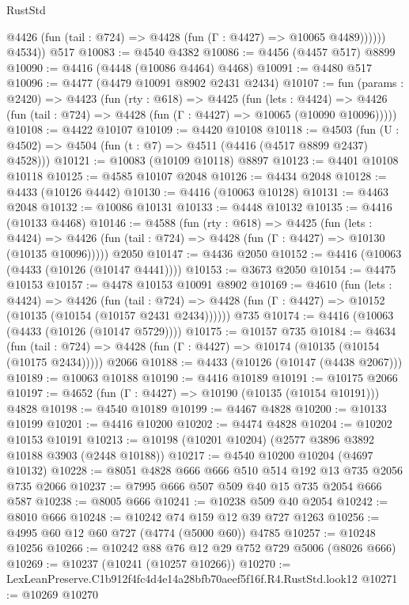\begin{lexlean}{RustStd}
\begin{coremodule}
              @4426 (fun (tail : @724) => @4428 (fun (Γ : @4427) => @10065 @4489))))))
        @4534))
    @517
@10083 := @4540 @4382
@10086 := @4456 (@4457 @517) @8899
@10090 := @4416 (@4448 (@10086 @4464) @4468)
@10091 := @4480 @517
@10096 := @4477 (@4479 @10091 @8902 @2431 @2434)
@10107 := fun (params : @2420) =>
  @4423
    (fun (rty : @618) =>
    @4425
      (fun (lets : @4424) =>
      @4426 (fun (tail : @724) => @4428 (fun (Γ : @4427) => @10065 (@10090 @10096)))))
@10108 := @4422 @10107
@10109 := @4420 @10108
@10118 := @4503 (fun (U : @4502) => @4504 (fun (t : @7) => @4511 (@4416 (@4517 @8899 @2437) @4528)))
@10121 := @10083 (@10109 @10118) @8897
@10123 := @4401 @10108 @10118
@10125 := @4585 @10107 @2048
@10126 := @4434 @2048
@10128 := @4433 (@10126 @4442)
@10130 := @4416 (@10063 @10128)
@10131 := @4463 @2048
@10132 := @10086 @10131
@10133 := @4448 @10132
@10135 := @4416 (@10133 @4468)
@10146 := @4588
    (fun (rty : @618) =>
    @4425
      (fun (lets : @4424) =>
      @4426 (fun (tail : @724) => @4428 (fun (Γ : @4427) => @10130 (@10135 @10096)))))
    @2050
@10147 := @4436 @2050
@10152 := @4416 (@10063 (@4433 (@10126 (@10147 @4441))))
@10153 := @3673 @2050
@10154 := @4475 @10153
@10157 := @4478 @10153 @10091 @8902
@10169 := @4610
    (fun (lets : @4424) =>
    @4426
      (fun (tail : @724) =>
      @4428 (fun (Γ : @4427) => @10152 (@10135 (@10154 (@10157 @2431 @2434))))))
    @735
@10174 := @4416 (@10063 (@4433 (@10126 (@10147 @5729))))
@10175 := @10157 @735
@10184 := @4634
    (fun (tail : @724) => @4428 (fun (Γ : @4427) => @10174 (@10135 (@10154 (@10175 @2434)))))
    @2066
@10188 := @4433 (@10126 (@10147 (@4438 @2067)))
@10189 := @10063 @10188
@10190 := @4416 @10189
@10191 := @10175 @2066
@10197 := @4652 (fun (Γ : @4427) => @10190 (@10135 (@10154 @10191))) @4828
@10198 := @4540 @10189
@10199 := @4467 @4828
@10200 := @10133 @10199
@10201 := @4416 @10200
@10202 := @4474 @4828
@10204 := @10202 @10153 @10191
@10213 := @10198 (@10201 @10204) (@2577 @3896 @3892 @10188 @3903 (@2448 @10188))
@10217 := @4540 @10200 @10204 (@4697 @10132)
@10228 := @8051 @4828 @666 @666 @510 @514 @192 @13 @735 @2056 @735 @2066
@10237 := @7995 @666 @507 @509 @40 @15 @735 @2054 @666 @587
@10238 := @8005 @666
@10241 := @10238 @509 @40 @2054
@10242 := @8010 @666
@10248 := @10242 @74 @159 @12 @39 @727 @1263
@10256 := @4995 @60 @12 @60 @727 (@4774 (@5000 @60)) @4785
@10257 := @10248 @10256
@10266 := @10242 @88 @76 @12 @29 @752 @729 @5006 (@8026 @666)
@10269 := @10237 (@10241 (@10257 @10266))
@10270 := LexLeanPreserve.C1b912f4fc4d4e14a28bfb70aeef5f16f.R4.RustStd.look12
@10271 := @10269 @10270

\end{coremodule}
\end{lexlean}
